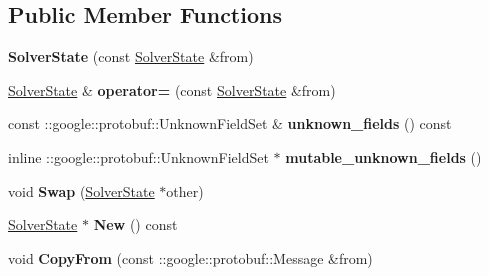 \subsection*{Public Member Functions}
\begin{DoxyCompactItemize}
\item 
\mbox{\label{classcaffe_1_1_solver_state_a4390350248eeb1f1f6d817e2705048c7}} 
{\bfseries Solver\+State} (const \mbox{\hyperlink{classcaffe_1_1_solver_state}{Solver\+State}} \&from)
\item 
\mbox{\label{classcaffe_1_1_solver_state_a92186cf43fc6f3883e5191a06ef97315}} 
\mbox{\hyperlink{classcaffe_1_1_solver_state}{Solver\+State}} \& {\bfseries operator=} (const \mbox{\hyperlink{classcaffe_1_1_solver_state}{Solver\+State}} \&from)
\item 
\mbox{\label{classcaffe_1_1_solver_state_a80eb1ff8d93a516aaa4502fefef3e504}} 
const \+::google\+::protobuf\+::\+Unknown\+Field\+Set \& {\bfseries unknown\+\_\+fields} () const
\item 
\mbox{\label{classcaffe_1_1_solver_state_af86c44b9452ab75fce7bebd8f0a3df8b}} 
inline \+::google\+::protobuf\+::\+Unknown\+Field\+Set $\ast$ {\bfseries mutable\+\_\+unknown\+\_\+fields} ()
\item 
\mbox{\label{classcaffe_1_1_solver_state_a3e04c978054957dddc49143ec9a77f6f}} 
void {\bfseries Swap} (\mbox{\hyperlink{classcaffe_1_1_solver_state}{Solver\+State}} $\ast$other)
\item 
\mbox{\label{classcaffe_1_1_solver_state_abab584aee0f106e89d751e7103c9668d}} 
\mbox{\hyperlink{classcaffe_1_1_solver_state}{Solver\+State}} $\ast$ {\bfseries New} () const
\item 
\mbox{\label{classcaffe_1_1_solver_state_a0c5b64fe3da4286ea521a755d472a6af}} 
void {\bfseries Copy\+From} (const \+::google\+::protobuf\+::\+Message \&from)
\item 
\mbox{\label{classcaffe_1_1_solver_state_aa7a4ab2581cc220b4efa07d5522877f2}} 

\end{DoxyCompactItemize}
